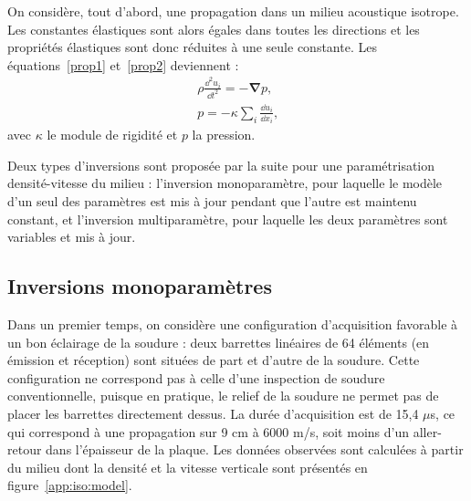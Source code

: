 On considère, tout d'abord, une propagation dans un milieu acoustique isotrope. Les constantes élastiques sont alors égales dans toutes les directions et les propriétés élastiques sont donc réduites à une seule constante. Les équations~\ref{prop1} et~\ref{prop2} deviennent : 
\begin{eqnarray}
	\rho \frac{\dd^2 u_{i}}{\dd t^2} = -\bm{\nabla} p \text{,}\\
	p=-\kappa \displaystyle\sum_{i} \frac{\dd u_{i}}{\dd x_{i}}\text{,}
\end{eqnarray}
avec $\kappa$ le module de rigidité et $p$ la pression.

Deux types d'inversions sont proposée par la suite pour une paramétrisation densité-vitesse du milieu : l'inversion monoparamètre, pour laquelle le modèle d'un seul des paramètres est mis à jour pendant que l'autre est maintenu constant, et l'inversion multiparamètre, pour laquelle les deux paramètres sont variables et mis à jour.


\subsection{Inversions monoparamètres}

 Dans un premier temps, on considère une configuration d'acquisition favorable à un bon éclairage de la soudure : deux barrettes linéaires de 64 éléments (en émission et réception) sont situées de part et d'autre de la soudure. Cette configuration ne correspond pas à celle d'une inspection de soudure conventionnelle, puisque en pratique, le relief de la soudure ne permet pas de placer les barrettes directement dessus. La durée d'acquisition est de 15,4 $\mu$s, ce qui correspond à une propagation sur 9 cm à 6000 m/s, soit moins d'un aller-retour dans l'épaisseur de la plaque. Les données observées sont calculées à partir du milieu dont la densité et  la vitesse verticale sont présentés en figure~\ref{app:iso:model}.\\


